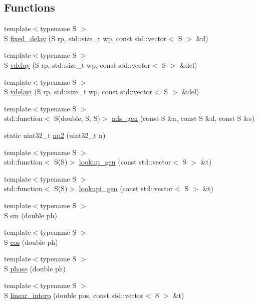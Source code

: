 \subsection*{Functions}
\begin{DoxyCompactItemize}
\item 
{\footnotesize template$<$typename S $>$ }\\S \hyperlink{namespace_aurora_a62442f237e70fdaac1efc22b4e82e875}{fixed\+\_\+delay} (S rp, std\+::size\+\_\+t wp, const std\+::vector$<$ S $>$ \&d)
\item 
{\footnotesize template$<$typename S $>$ }\\S \hyperlink{namespace_aurora_ab93392950e0b9ae8fbbccf7cc1b55a13}{vdelay} (S rp, std\+::size\+\_\+t wp, const std\+::vector$<$ S $>$ \&del)
\item 
{\footnotesize template$<$typename S $>$ }\\S \hyperlink{namespace_aurora_a5318ddb492590ada5dc40ba80bbf655b}{vdelayi} (S rp, std\+::size\+\_\+t wp, const std\+::vector$<$ S $>$ \&del)
\item 
{\footnotesize template$<$typename S $>$ }\\std\+::function$<$ S(double, S, S)$>$ \hyperlink{namespace_aurora_a966a076f1768216bd9c2d6a07aebf034}{ads\+\_\+gen} (const S \&a, const S \&d, const S \&s)
\item 
static uint32\+\_\+t \hyperlink{namespace_aurora_a49b6f6d92479d80271ced42627154066}{np2} (uint32\+\_\+t n)
\item 
{\footnotesize template$<$typename S $>$ }\\std\+::function$<$ S(S)$>$ \hyperlink{namespace_aurora_ade912bee8dbe0351b2193809ce592d8b}{lookup\+\_\+gen} (const std\+::vector$<$ S $>$ \&t)
\item 
{\footnotesize template$<$typename S $>$ }\\std\+::function$<$ S(S)$>$ \hyperlink{namespace_aurora_a043c55515e053a8d6f31ed7077a1bea6}{lookupi\+\_\+gen} (const std\+::vector$<$ S $>$ \&t)
\item 
{\footnotesize template$<$typename S $>$ }\\S \hyperlink{namespace_aurora_a388ea5736944d8887f5586afd45a03b8}{sin} (double ph)
\item 
{\footnotesize template$<$typename S $>$ }\\S \hyperlink{namespace_aurora_ab6ef1b966b8f27d107fcabe1027a677a}{cos} (double ph)
\item 
{\footnotesize template$<$typename S $>$ }\\S \hyperlink{namespace_aurora_a2fab91108d29c7101741bcd2ebe1ba72}{phase} (double ph)
\item 
{\footnotesize template$<$typename S $>$ }\\S \hyperlink{namespace_aurora_acdc5f35b9cbf54f7fc84a423d76bd488}{linear\+\_\+interp} (double pos, const std\+::vector$<$ S $>$ \&t)
\end{DoxyCompactItemize}
